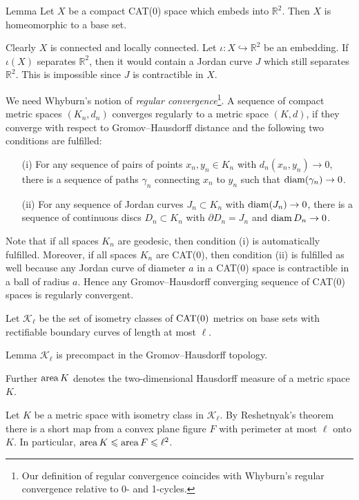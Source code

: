 \documentclass[a4paper,10pt]{amsart}
\begin{document}
\begin{thm}{Lemma}
 Let $X$ be a compact CAT(0) space which embeds into $\mathbb{R}^2$. Then $X$
 is homeomorphic to a base set.
\end{thm}

Clearly $X$ is connected and locally connected. Let $\iota :X\hookrightarrow\mathbb{R}^2$ be an embedding.
If $\iota(X)$ separates $\mathbb{R}^2$, then it would contain a Jordan curve $J$ which still separates
$\mathbb{R}^2$. This is impossible since $J$ is contractible in $X$.
\qeds

We need Whyburn's notion of {\em regular convergence}\footnote{Our definition of regular convergence coincides with Whyburn's regular convergence relative
to 0- and 1-cycles.}. A sequence of compact metric spaces $(K_n,d_n)$ converges regularly to a 
metric space $(K,d)$, if they converge with respect to Gromov--Hausdorff distance and the following two conditions are fulfilled:
\begin{itemize}
 \item[(i)] For any sequence of pairs of points $x_n,y_n\in K_n$ with $d_n(x_n,y_n)\to 0$, there is a sequence of paths $\gamma_n$
 connecting $x_n$ to $y_n$ such that $\mathop{\rm diam}\nolimits(\gamma_n)\to 0$.
 \item[(ii)] For any sequence of Jordan curves $J_n\subset K_n$ with $\mathop{\rm diam}\nolimits(J_n)\to 0$, there is a sequence of continuous discs $D_n\subset K_n$
 with $\partial D_n=J_n$ and $\mathop{\rm diam}\nolimits D_n\to 0$. 
\end{itemize}

Note that if all spaces $K_n$ are geodesic, then condition (i) is automatically fulfilled. Moreover, if all 
spaces $K_n$ are CAT(0), then condition (ii) is fulfilled as well because any Jordan curve of diameter $a$ in a CAT(0)
space is contractible in a ball of radius $a$. Hence any Gromov--Hausdorff converging sequence of CAT(0) spaces is 
regularly convergent.

Let $\mathcal{K}_\ell$ be the set of isometry classes of $\mathop{\rm CAT}\nolimits(0)$ metrics on base sets with rectifiable
boundary curves of length at most $\ell$.



\begin{thm}{Lemma}
$\mathcal{K}_\ell$ is precompact in the Gromov--Hausdorff topology.
\end{thm}

Further $\mathop{\rm area}\nolimits K$ denotes the two-dimensional Hausdorff measure of a metric space $K$. 

Let $K$ be a metric space with isometry class in $\mathcal {K}_\ell$.
By Reshetnyak's theorem there is a short map from a convex plane figure $F$ with perimeter at most $\ell$ onto $K$.
In particular, $\mathop{\rm area}\nolimits K \leqslant \mathop{\rm area}\nolimits F 
\leqslant \ell^2$.
\end{document}
